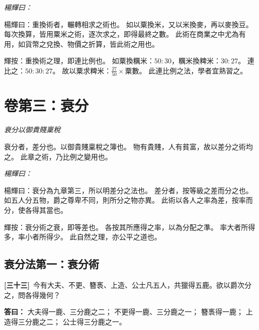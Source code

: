 \documentclass[11pt,a4paper]{article}
\newenvironment{yanghuicomment}{%
  \par\noindent\textcolor{commentarycolor}{\small\textit{楊輝曰：}}%
  \ignorespaces
}{\par\vspace{0.5em}}
\newcommand{\problemnum}[1]{\textbf{[\ignorespaces#1\unskip]}}
\begin{document}
\begin{yanghuicomment}
楊輝曰：重換術者，輾轉相求之術也。
如以粟換米，又以米換麥，再以麥換豆。
每次換算，皆用粟米之術，逐次求之，即得最終之數。
此術在商業之中尤為有用，如貨幣之兌換、物價之折算，皆此術之用也。

輝按：重換術之理，即連比例也。
如粟換糲米：$50 : 30$，糲米換粺米：$30 : 27$。
連比之：$50 : 30 : 27$。
故以粟求粺米：$\frac{27}{50} \times 粟數$。
此連比例之法，學者宜熟習之。
\end{yanghuicomment}

\newpage

\section{卷第三：衰分}
\label{sec:cuifen}

\begin{center}
\textit{衰分以御貴賤稟稅}
\end{center}

衰分者，差分也。以御貴賤稟稅之簿也。
物有貴賤，人有貧富，故以差分之術均之。
此章之術，乃比例之變用也。

\begin{yanghuicomment}
楊輝曰：衰分為九章第三，所以明差分之法也。
差分者，按等級之差而分之也。
如五人分五物，爵之尊卑不同，則所分之物亦異。
此術以各人之率為差，按率而分，使各得其當也。

輝按：衰分術之衰，即等差也。
各按其所應得之率，以為分配之準。
率大者所得多，率小者所得少。
此自然之理，亦公平之道也。
\end{yanghuicomment}

\subsection{衰分法第一：衰分術}

\noindent\problemnum{三十三}\,
今有大夫、不更、簪褭、上造、公士凡五人，共獵得五鹿。欲以爵次分之，問各得幾何？

\noindent\textcolor{answercolor}{\textbf{答曰：}}
大夫得一鹿、三分鹿之二；
不更得一鹿、三分鹿之一；
簪褭得一鹿；
上造得三分鹿之二；
公士得三分鹿之一。
\end{document}
